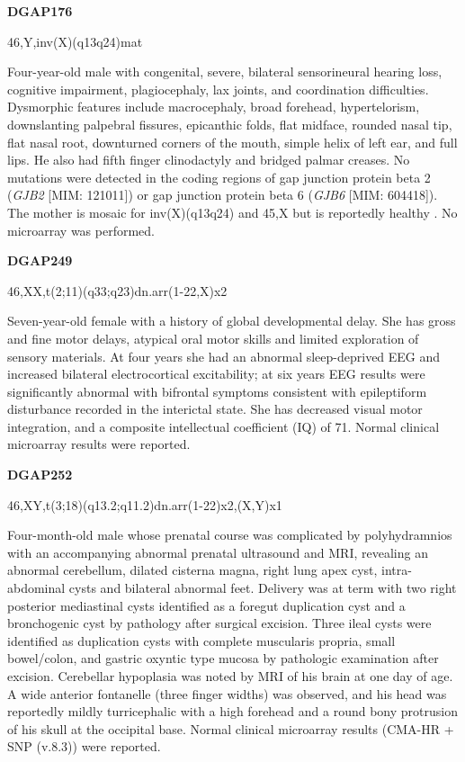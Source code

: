 \documentclass[a4paper,twoside=true,openright,parskip=full,chapterprefix=true,11pt,headings=normal,bibliography=totoc,listof=totoc,titlepage=on,captions=tableabove,draft=false]{scrreprt}
\theoremstyle{definition}
\theoremstyle{definition}
\theoremstyle{definition}
\theoremstyle{remark}
\begin{document}
\textbf{DGAP176}

46,Y,inv(X)(q13q24)mat

Four-year-old male with congenital, severe, bilateral sensorineural
hearing loss, cognitive impairment, plagiocephaly, lax joints, and
coordination difficulties. Dysmorphic features include macrocephaly,
broad forehead, hypertelorism, downslanting palpebral fissures,
epicanthic folds, flat midface, rounded nasal tip, flat nasal root,
downturned corners of the mouth, simple helix of left ear, and full
lips. He also had fifth finger clinodactyly and bridged palmar creases.
No mutations were detected in the coding regions of gap junction protein
beta 2 (\emph{GJB2} {[}MIM: 121011{]}) or gap junction protein beta 6
(\emph{GJB6} {[}MIM: 604418{]}). The mother is mosaic for inv(X)(q13q24)
and 45,X but is reportedly healthy \citep{Anger2014}. No microarray was
performed.

\textbf{DGAP249}

46,XX,t(2;11)(q33;q23)dn.arr(1-22,X)x2

Seven-year-old female with a history of global developmental delay. She
has gross and fine motor delays, atypical oral motor skills and limited
exploration of sensory materials. At four years she had an abnormal
sleep-deprived EEG and increased bilateral electrocortical excitability;
at six years EEG results were significantly abnormal with bifrontal
symptoms consistent with epileptiform disturbance recorded in the
interictal state. She has decreased visual motor integration, and a
composite intellectual coefficient (IQ) of 71. Normal clinical
microarray results were reported.

\textbf{DGAP252}

46,XY,t(3;18)(q13.2;q11.2)dn.arr(1-22)x2,(X,Y)x1

Four-month-old male whose prenatal course was complicated by
polyhydramnios with an accompanying abnormal prenatal ultrasound and
MRI, revealing an abnormal cerebellum, dilated cisterna magna, right
lung apex cyst, intra-abdominal cysts and bilateral abnormal feet.
Delivery was at term with two right posterior mediastinal cysts
identified as a foregut duplication cyst and a bronchogenic cyst by
pathology after surgical excision. Three ileal cysts were identified as
duplication cysts with complete muscularis propria, small bowel/colon,
and gastric oxyntic type mucosa by pathologic examination after
excision. Cerebellar hypoplasia was noted by MRI of his brain at one day
of age. A wide anterior fontanelle (three finger widths) was observed,
and his head was reportedly mildly turricephalic with a high forehead
and a round bony protrusion of his skull at the occipital base. Normal
clinical microarray results (CMA-HR + SNP (v.8.3)) were reported.
\end{document}
